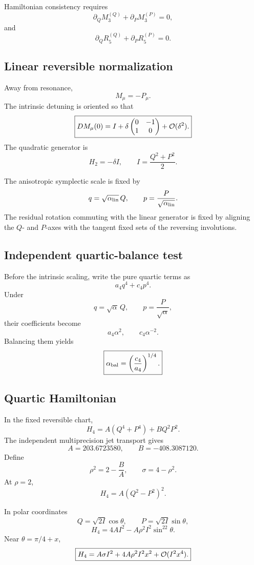 Hamiltonian consistency requires
\[
\partial_QM_3^{(Q)}+\partial_PM_3^{(P)}=0,
\]
and
\[
\partial_QR_5^{(Q)}+\partial_PR_5^{(P)}=0.
\]

\subsection{Linear reversible normalization}

Away from resonance,
\[
M_\mu=-P_\mu.
\]
The intrinsic detuning is oriented so that
\[
\boxed{
DM_\mu(0)
=
I+
\delta
\begin{pmatrix}
0&-1\\
1&0
\end{pmatrix}
+\mathcal{O}(\delta^2).
}
\]
The quadratic generator is
\[
\boxed{
H_2=-\delta I,\qquad I=\frac{Q^2+P^2}{2}.
}
\]

The anisotropic symplectic scale is fixed by
\[
q=\sqrt{\alpha_{\rm lin}}\,Q,\qquad
p=\frac{P}{\sqrt{\alpha_{\rm lin}}}.
\]
The residual rotation commuting with the linear generator is fixed by aligning the \(Q\)- and \(P\)-axes with the tangent fixed sets of the reversing involutions.

\subsection{Independent quartic-balance test}

Before the intrinsic scaling, write the pure quartic terms as
\[
a_4q^4+c_4p^4.
\]
Under
\[
q=\sqrt{\alpha}\,Q,\qquad
p=\frac{P}{\sqrt{\alpha}},
\]
their coefficients become
\[
a_4\alpha^2,\qquad c_4\alpha^{-2}.
\]
Balancing them yields
\[
\boxed{
\alpha_{\rm bal}
=
\left(\frac{c_4}{a_4}\right)^{1/4}.
}
\]

\subsection{Quartic Hamiltonian}

In the fixed reversible chart,
\[
\boxed{
H_4=A(Q^4+P^4)+BQ^2P^2.
}
\]
The independent multiprecision jet transport gives
\[
A=203.6723580,\qquad B=-408.3087120.
\]
Define
\[
\boxed{
\rho^2=2-\frac BA,
}
\qquad
\boxed{
\sigma=4-\rho^2.
}
\]
At \(\rho=2\),
\[
\boxed{
H_4=A(Q^2-P^2)^2.
}
\]

In polar coordinates
\[
Q=\sqrt{2I}\cos\theta,\qquad
P=\sqrt{2I}\sin\theta,
\]
\[
\boxed{
H_4
=
4AI^2-A\rho^2I^2\sin^22\theta.
}
\]
Near \(\theta=\pi/4+x\),
\[
\boxed{
H_4
=
A\sigma I^2+
4A\rho^2I^2x^2+
\mathcal{O}(I^2x^4).
}
\]

